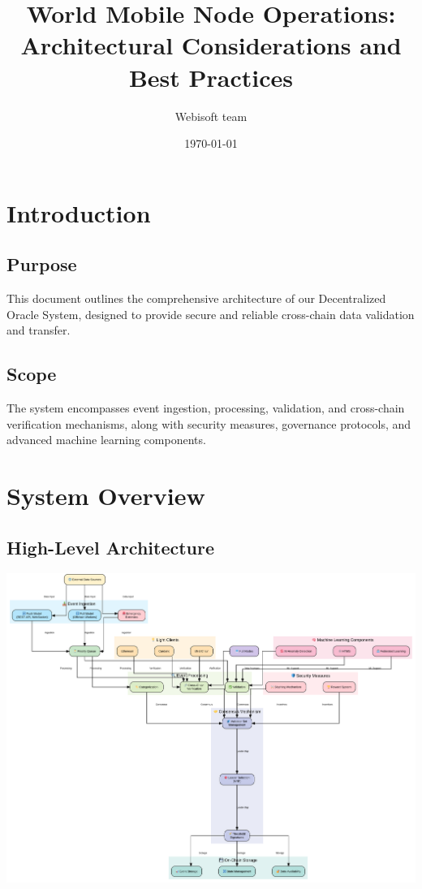 \documentclass[12pt,a4paper]{article}
\title{World Mobile Node Operations: Architectural Considerations and Best Practices}
\author{Webisoft team}
\date{\today}
\begin{document}
	
	\maketitle
	
	\tableofcontents
	
	\section{Introduction}
	\subsection{Purpose}
	This document outlines the comprehensive architecture of our Decentralized Oracle System, designed to provide secure and reliable cross-chain data validation and transfer.
	
	\subsection{Scope}
	The system encompasses event ingestion, processing, validation, and cross-chain verification mechanisms, along with security measures, governance protocols, and advanced machine learning components.
	
	
	
	
	
	\section{System Overview}
	\subsection{High-Level Architecture}
	\includegraphics[width=\textwidth]{gen_arch.png}
	
\end{document}
